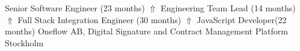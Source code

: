 {Senior Software Engineer (23 months) \(\Uparrow\) Engineering Team Lead (14 months) \(\Uparrow\) Full Stack Integration Engineer (30 months)  \(\Uparrow\) JavaScript Developer(22 months)}
{Oneflow AB,  Digital Signature and Contract Management Platform}
{Stockholm \Large{}}{}
{
}
